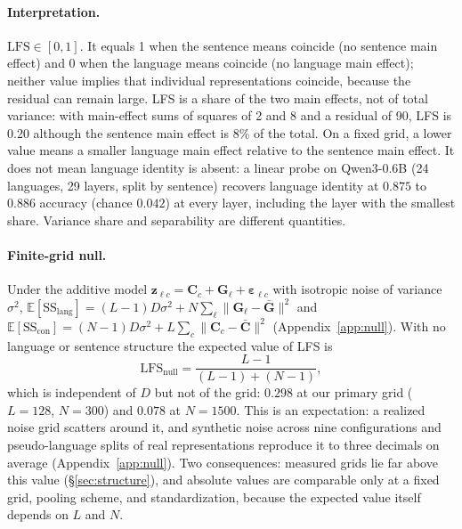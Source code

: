 \documentclass{article} %
\def\vz{{\bm{z}}}
\newcommand{\vC}{{\bm{C}}}
\newcommand{\vG}{{\bm{G}}}
\newcommand{\veps}{{\bm{\varepsilon}}}
\newcommand{\LFS}{\mathrm{LFS}}
\newcommand{\SSl}{\mathrm{SS}_{\mathrm{lang}}}
\newcommand{\SSc}{\mathrm{SS}_{\mathrm{con}}}
\begin{document}
\paragraph{Interpretation.} $\LFS \in [0, 1]$. It equals 1 when the sentence means coincide (no sentence main effect) and 0 when the language means coincide (no language main effect); neither value implies that individual representations coincide, because the residual can remain large. LFS is a share of the two main effects, not of total variance: with main-effect sums of squares of 2 and 8 and a residual of 90, LFS is 0.20 although the sentence main effect is 8\% of the total. On a fixed grid, a lower value means a smaller language main effect relative to the sentence main effect. It does not mean language identity is absent: a linear probe on Qwen3-0.6B (24 languages, 29 layers, split by sentence) recovers language identity at $0.875$ to $0.886$ accuracy (chance $0.042$) at every layer, including the layer with the smallest share. Variance share and separability are different quantities.

\paragraph{Finite-grid null.} Under the additive model
$\vz_{\ell c} = \vC_c + \vG_\ell + \veps_{\ell c}$ with isotropic
noise of variance $\sigma^2$,
$\mathbb{E}[\SSl] = (L-1) D \sigma^2 + N \sum_\ell \lVert \vG_\ell - \bar\vG\rVert^2$
and
$\mathbb{E}[\SSc] = (N-1) D \sigma^2 + L \sum_c \lVert \vC_c - \bar\vC\rVert^2$
(Appendix~\ref{app:null}). With no language or sentence structure the expected value of LFS is
\begin{equation}
\LFS_{\mathrm{null}} = \frac{L-1}{(L-1)+(N-1)},
\label{eq:null}
\end{equation}
which is independent of $D$ but not of the grid: $0.298$ at our primary grid ($L{=}128$, $N{=}300$) and $0.078$ at $N{=}1500$. This is an expectation: a realized noise grid scatters around it, and synthetic noise across nine configurations and pseudo-language splits of real representations reproduce it to three decimals on average (Appendix~\ref{app:null}). Two consequences: measured grids lie far above this value (\S\ref{sec:structure}), and absolute values are comparable only at a fixed grid, pooling scheme, and standardization, because the expected value itself depends on $L$ and $N$. 
\end{document}
